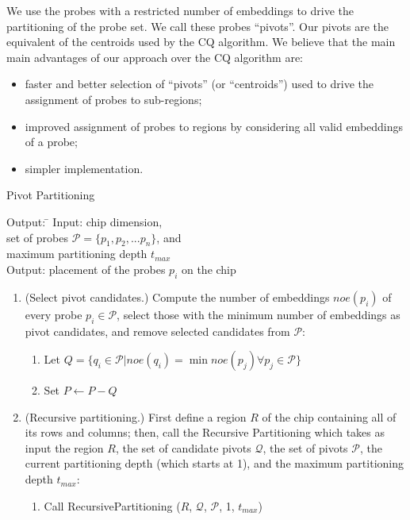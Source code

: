 \documentclass{llncs}
\begin{document}
We use the probes with a restricted number of embeddings to drive the partitioning
of the probe set. We call these probes ``pivots''. Our pivots are the equivalent of the
centroids used by the CQ algorithm. We believe that the main main advantages of our
approach over the CQ algorithm are:

\begin{itemize}
\item faster and better selection of ``pivots'' (or ``centroids'') used to drive
the assignment of probes to sub-regions;
\item improved assignment of probes to regions by considering all valid embeddings
of a probe;
\item simpler implementation.
\end{itemize}

\begin{algorithm}
\caption{Pivot Partitioning}
\label{alg:pivotpart}
\begin{minipage}{4.8in}

\begin{tabbing}
Output: \=									\kill
Input:  \> chip dimension,							\\
        \> set of probes $\mathcal{P} = \{p_{1}, p_{2}, ... p_{n}\}$, and	\\
        \> maximum partitioning depth $t_{max}$					\\
Output: \> placement of the probes $p_i$ on the chip
\end{tabbing}

\begin{enumerate}
\item (Select pivot candidates.) Compute the number of embeddings $noe(p_i)$
of every probe $p_i \in \mathcal{P}$, select those with the minimum number
of embeddings as pivot candidates, and remove selected candidates from
$\mathcal{P}$:
  \begin{enumerate}
  \item Let $Q = \{q_i \in \mathcal{P} | noe(q_i) = \min noe(p_j) \forall p_j \in \mathcal{P} \}$
  \item Set $P \leftarrow P - Q$
  \end{enumerate}
\item (Recursive partitioning.) First define a region $R$ of the chip containing
all of its rows and columns; then, call the Recursive Partitioning which takes as
input the region $R$, the set of candidate pivots $\mathcal{Q}$, the set of pivots
$\mathcal{P}$, the current partitioning depth (which starts at 1), and the
maximum partitioning depth $t_{max}$:
  \begin{enumerate}
  \item Call RecursivePartitioning ($R$, $\mathcal{Q}$, $\mathcal{P}$, 1, $t_{max}$)
  \end{enumerate}
\end{enumerate}

\end{minipage}
\end{algorithm}
\end{document}
